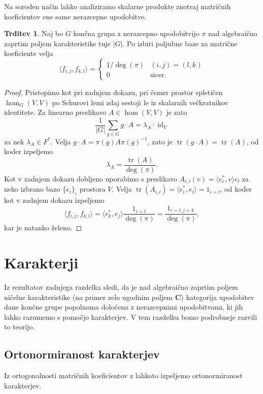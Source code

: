 \documentclass[11pt]{book}
\def\CC{\mathbf{C}}
\DeclareMathOperator\tr{tr}
\DeclareMathOperator\id{id}
\theoremstyle{definition}
\theoremstyle{zgled}
\theoremstyle{odprtproblem}
\theoremstyle{domacanaloga}
\newenvironment{dokaz}
    {\color{siva}\begin{proof}}
    {\end{proof}}
\theoremstyle{izrek}
\newtheorem*{trditev}{Trditev}
\begin{document}
Na soroden način lahko analiziramo skalarne produkte znotraj matričnih koeficientov ene same nerazcepne upodobitve.

\begin{trditev}
Naj bo $G$ končna grupa z nerazcepno upodobitvijo $\pi$ nad algebraično zaprtim poljem karakteristike tuje $|G|$. Po izbiri poljubne baze za matrične koeficiente velja
\[
    \langle f_{i,j}, f_{k,l} \rangle = 
    \begin{cases}
        1/\deg(\pi) & (i,j) = (l,k) \\
        0 & \text{sicer.}
    \end{cases}
\]
\end{trditev}
\begin{dokaz}
Pristopimo kot pri zadnjem dokazu, pri čemer prostor spletičen $\hom_G(V,V)$ po Schurovi lemi zdaj sestoji le iz skalarnih večkratnikov identitete. Za linearno preslikavo $A \in \hom(V,V)$ je zato
\[
    \frac{1}{|G|} \sum_{g \in G} g \cdot A = \lambda_A \cdot \id_V
\]
za nek $\lambda_A \in F^*$. Velja $g \cdot A = \pi(g) A \pi(g)^{-1}
$, zato je $\tr(g \cdot A) = \tr(A)$, od koder izpeljemo
\[
    \lambda_A = \frac{\tr(A)}{\deg(\pi)}.
\]
Kot v zadnjem dokazu dobljeno uporabimo s preslikavo $A_{i,l}(v) = \langle e_i^*, v \rangle e_l$ za neko izbrano bazo $\{ e_i \}_i$ prostora $V$. Velja $\tr(A_{i,l}) = \langle e_i^*, e_l \rangle = 1_{i = l}$, od koder kot v zadnjem dokazu izpeljemo
\[
    \langle f_{i,j}, f_{k,l} \rangle = \langle e_k^*, e_j \rangle \frac{1_{i = l}}{\deg(\pi)} = \frac{1_{i = l, j = k}}{\deg(\pi)},
\]
kar je natanko želeno.
\end{dokaz}

\section{Karakterji}

Iz rezultatov zadnjega razdelka sledi, da je nad algebraično zaprtim poljem ničelne karakteristike (na primer zelo ugodnim poljem $\CC$) kategorija upodobitev dane končne grupe popolnoma določena z nerazcepnimi upodobitvami, ki jih lahko razumemo s pomočjo karakterjev. V tem razdelku bomo podrobneje razvili to teorijo.

\subsection{Ortonormiranost karakterjev}

Iz ortogonalnosti matričnih koeficientov z lahkoto izpeljemo ortonormiranost karakterjev.
\end{document}
